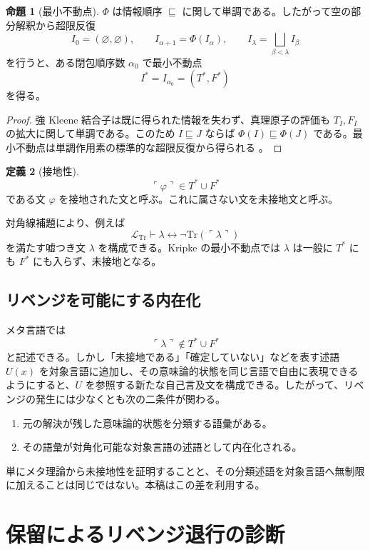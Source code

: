 \documentclass[11pt,a4paper]{article}
\theoremstyle{definition}
\newtheorem{definition}{定義}[section]
\theoremstyle{definition}
\newtheorem{proposition}[definition]{命題}
\newcommand{\Tr}{\mathrm{Tr}}
\newcommand{\Lang}{\mathcal{L}}
\begin{document}
\begin{proposition}[最小不動点]
$\Phi$ は情報順序 $\sqsubseteq$ に関して単調である。したがって空の部分解釈から超限反復
\[
 I_0=(\varnothing,\varnothing),\qquad
 I_{\alpha+1}=\Phi(I_\alpha),\qquad
 I_\lambda=\bigsqcup_{\beta<\lambda}I_\beta
\]
を行うと、ある閉包順序数 $\alpha_0$ で最小不動点
\[
 I^*=I_{\alpha_0}=(T^*,F^*)
\]
を得る。
\end{proposition}

\begin{proof}
強 Kleene 結合子は既に得られた情報を失わず、真理原子の評価も $T_I,F_I$ の拡大に関して単調である。このため $I\sqsubseteq J$ ならば $\Phi(I)\sqsubseteq\Phi(J)$ である。最小不動点は単調作用素の標準的な超限反復から得られる \cite{kripke,kleene}。
\end{proof}

\begin{definition}[接地性]
\[
 \ulcorner\varphi\urcorner\in T^*\cup F^*
\]
である文 $\varphi$ を接地された文と呼ぶ。これに属さない文を未接地文と呼ぶ。
\end{definition}

対角線補題により、例えば
\[
 \Lang_{\Tr}\vdash
 \lambda\leftrightarrow
 \neg\Tr(\ulcorner\lambda\urcorner)
\]
を満たす嘘つき文 $\lambda$ を構成できる。Kripke の最小不動点では $\lambda$ は一般に $T^*$ にも $F^*$ にも入らず、未接地となる。

\subsection{リベンジを可能にする内在化}

メタ言語では
\[
 \ulcorner\lambda\urcorner\notin T^*\cup F^*
\]
と記述できる。しかし「未接地である」「確定していない」などを表す述語 $U(x)$ を対象言語に追加し、その意味論的状態を同じ言語で自由に表現できるようにすると、$U$ を参照する新たな自己言及文を構成できる。したがって、リベンジの発生には少なくとも次の二条件が関わる。

\begin{enumerate}
 \item 元の解決が残した意味論的状態を分類する語彙がある。
 \item その語彙が対角化可能な対象言語の述語として内在化される。
\end{enumerate}

単にメタ理論から未接地性を証明することと、その分類述語を対象言語へ無制限に加えることは同じではない。本稿はこの差を利用する。

\section{保留によるリベンジ退行の診断}
\end{document}
